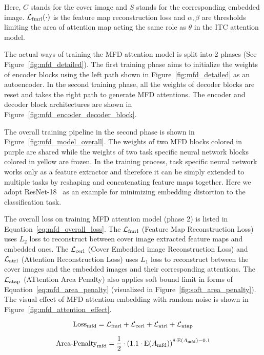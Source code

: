 Here, \(C\) stands for the cover image and \(S\) stands for the corresponding embedded image. \(\mathcal{L}_\mathrm{fmrl}(\cdot)\) is the feature map reconstruction loss and \( \alpha, \beta \) are thresholds limiting the area of attention map acting the same role as \( \theta \) in the ITC attention model.


\figureMFDModelOverall%
 
\figureMfdEncoderDecoderBlock%

The actual ways of training the MFD attention model is split into 2 phases (See Figure~\ref{fig:mfd_detailed}). The first training phase aims to initialize the weights of encoder blocks using the left path shown in Figure~\ref{fig:mfd_detailed} as an autoencoder. In the second training phase, all the weights of decoder blocks are reset and takes the right path to generate MFD attentions. The encoder and decoder block architectures are shown in Figure~\ref{fig:mfd_encoder_decoder_block}.

The overall training pipeline in the second phase is shown in Figure~\ref{fig:mfd_model_overall}. The weights of two MFD blocks colored in purple are shared while the weights of two task specific neural network blocks colored in yellow are frozen. In the training process, task specific neural network works only as a feature extractor and therefore it can be simply extended to multiple tasks by reshaping and concatenating feature maps together. Here we adopt ResNet-18~\cite{ResNet} as an example for minimizing embedding distortion to the classification task.

The overall loss on training MFD attention model (phase 2) is listed in Equation~\ref{eq:mfd_overall_loss}.
The \( \mathcal{L}_\mathrm{fmrl} \) (Feature Map Reconstruction Loss) uses \(L_2\) loss to reconstruct between cover image extracted feature maps and embedded ones. The \( \mathcal{L}_\mathrm{cerl} \) (Cover Embedded image Reconstruction Loss) and \( \mathcal{L}_\mathrm{atrl} \) (Attention Reconstruction Loss) uses \(L_1\) loss to reconstruct between the cover images and the embedded images and their corresponding attentions. The \( \mathcal{L}_\mathrm{atap} \) (ATtention Area Penalty) also applies soft bound limit in forms of Equation~\ref{eq:mfd_area_penalty} (visualized in Figure~\ref{fig:soft_area_penalty}). The visual effect of MFD attention embedding with random noise is shown in Figure~\ref{fig:mfd_attention_effect}.

\begin{equation}
  \mathrm{Loss}_{\text{mfd}} = \mathcal{L}_\mathrm{fmrl} + \mathcal{L}_\mathrm{cerl} + \mathcal{L}_\mathrm{atrl} + \mathcal{L}_\mathrm{atap}
  \label{eq:mfd_overall_loss}
\end{equation}

\begin{equation}
  \text{Area-Penalty}_{\text{mfd}} = \frac{1}{2} \cdot {(1.1 \cdot \mathrm{E}(A_{\text{mfd}}))}^{8 \cdot \mathrm{E}(A_{\text{mfd}}) - 0.1}
  \label{eq:mfd_area_penalty}
\end{equation}

\figureSoftAreaPenalty%

\figureMfdAttentionEffect%
